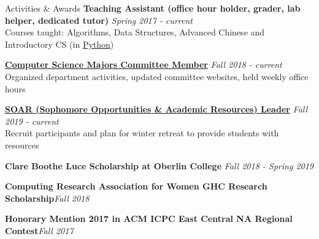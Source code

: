 \documentclass{resume}
\begin{document}
\begin{rSection}{Activities \& Awards}
{\bf Teaching Assistant (office hour holder, grader, lab helper, dedicated tutor)} \hfill {\em Spring 2017 - current} \\
Courses taught: Algorithms, Data Structures, Advanced Chinese and Introductory CS (in \underline{Python}) 

\href{http://www.cs.oberlin.edu/~csmc/officers.php}{\textbf{Computer Science Majors Committee Member}} \hfill {\em Fall 2018 - current} \\
Organized department activities, updated committee websites, held weekly office hours 


{\bf \href{https://www.oberlin.edu/career/set/soar/soar-leaders}{SOAR (Sophomore Opportunities \& Academic Resources) Leader}} \hfill{\em Fall 2019 - current} \\
Recruit participants and plan for winter retreat to provide students with resources

{\bf Clare Boothe Luce Scholarship at Oberlin College} \hfill{\em Fall 2018 - Spring 2019} 

{\bf Computing Research Association for Women GHC Research Scholarship}\hfill{\em Fall 2018}

{\bf Honorary Mention 2017 in ACM ICPC East Central NA Regional Contest}\hfill{\em Fall 2017}


\end{rSection}
\end{document}
